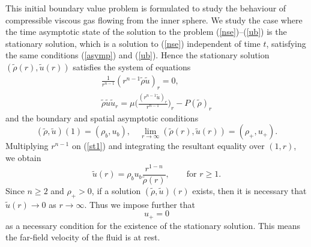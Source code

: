 \documentclass[a4paper,12pt,draft]{article}
\theoremstyle{remark}
\def\ut{\tilde{u}}
\def\rt{\tilde{\rho}}
\begin{document}
This initial boundary value problem is
formulated to study the behaviour of compressible
viscous gas flowing from the inner sphere.
We study the case where the time asymptotic state of the solution
to the problem (\ref{nse})--(\ref{ub}) is the stationary solution, which is a solution to (\ref{nse}) independent of time $t$, satisfying the same conditions (\ref{asymp}) and (\ref{ub}). Hence the stationary solution $(\rt(r), \ut(r))$ satisfies the system of equations
\begin{subequations}
\label{st}
\begin{gather}
\frac{1}{r^{n-1}}(r^{n-1} \rt \ut)_r = 0, \label{st1} \\
\rt \ut \ut_r = \mu \Big( \frac{(r^{n-1} \ut)_r}{r^{n-1}} \Big)_r
- P(\rt)_r \label{st2}
\end{gather}
\end{subequations}
and the boundary and spatial asymptotic conditions
\begin{equation}\label{stbdry}
 (\rt,\ut)(1) = (\rho_b,u_b), \quad
 \lim_{r \to \infty} (\rt(r), \ut(r)) = (\rho_+, u_+).
\end{equation}
Multiplying $r^{n-1}$ on (\ref{st1}) and integrating the resultant equality over $(1,r)$, we obtain
\begin{equation}\label{stu}
\ut(r) = \rho_b u_b \dfrac{r^{1-n}}{\rt(r)}, \qquad \text{for $r\ge1$.}
\end{equation}
Since $n\ge2$ and $\rho_+>0$, if a solution $(\rt,\ut)(r)$ exists, then it is necessary that $\ut(r)\to 0$ as $r\to\infty$. Thus we impose further that 
\begin{equation}\label{u+}
	u_+ = 0
\end{equation}
as a necessary condition for the
existence of the stationary solution. This means the far-field velocity of the fluid is at rest.
\end{document}
